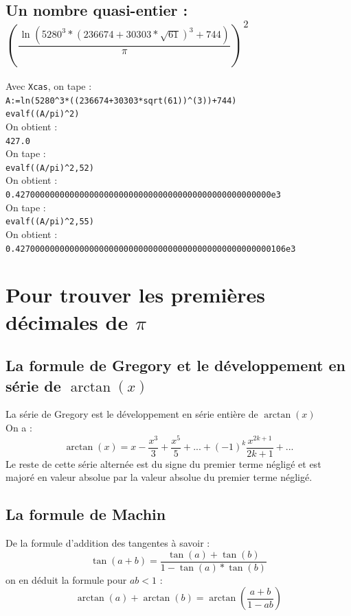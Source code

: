 \documentclass[a4paper,11pt]{book}
\begin{document}
\section{Un nombre quasi-entier : $(\frac{\ln(5280^3*(236674+30303*\sqrt{61})^3+744)}{\pi})^2$}
\noindent Avec {\tt Xcas}, on tape :\\
{\tt A:=ln(5280\verb|^|3*((236674+30303*sqrt(61))\verb|^|(3))+744)}\\
{\tt evalf((A/pi)\verb|^|2)}\\
On obtient :\\
{\tt 427.0}\\
On tape :\\
{\tt evalf((A/pi)\verb|^|2,52)}\\
On obtient :\\
{\tt 0.4270000000000000000000000000000000000000000000000000e3}\\
On tape :\\
{\tt evalf((A/pi)\verb|^|2,55)}\\
On obtient :\\
{\tt 0.4270000000000000000000000000000000000000000000000000106e3}\\

\chapter{Pour trouver les premi\`eres d\'ecimales de $\pi$}
\section{La formule de Gregory et le d\'eveloppement en s\'erie de $\arctan(x)$}
La s\'erie de Gregory est le d\'eveloppement en s\'erie enti\`ere de $\arctan(x)$\\
On a :
$$\arctan(x)=x-\frac{x^3}{3}+\frac{x^5}{5}+...+(-1)^k\frac{x^{2k+1}}{2k+1}+...$$
Le reste de cette s\'erie altern\'ee est du signe du premier terme n\'eglig\'e
et est major\'e en valeur absolue par la valeur absolue du premier terme n\'eglig\'e.
\section{La formule de Machin}
De la formule d'addition des tangentes \`a savoir :
$$\tan(a+b)=\frac{\tan(a)+\tan(b)}{1-\tan(a)*\tan(b)}$$
on en d\'eduit la formule pour $ab<1$ :
$$\arctan(a)+\arctan(b)=\arctan(\frac{a+b}{1-ab})$$
\end{document}
